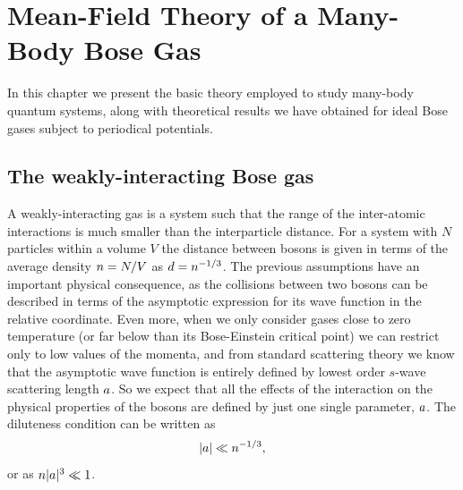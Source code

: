 \chapter{Mean-Field Theory of a Many-Body Bose Gas}%
\label{chap:mean-field-theory}


In this chapter we present the basic theory employed to study many-body quantum systems, along with theoretical
results we have obtained for ideal Bose gases subject to periodical potentials.


\section{The weakly-interacting Bose gas}
\label{sec:the-weakly-interacting-bose-gas}

A weakly-interacting gas is a system such that the range of the inter-atomic interactions is much smaller
than the
interparticle distance. For a system with $N$ particles within a volume $V$ the distance between bosons is given in
terms of the average density ${n} = N / V$ as $d = {n}^{-1/3}$. The previous assumptions have an
important physical consequence, as the collisions between two bosons can be described in terms of the asymptotic
expression for its wave function in the relative coordinate. Even more, when we only consider gases close to
zero temperature (or far below than its Bose-Einstein critical point) we can restrict only to low values of the
momenta, and from standard scattering theory we know that the asymptotic wave function is entirely defined by lowest
order $s$-wave scattering length $a$. So we expect that all the effects of the interaction on the physical properties
of the bosons are defined by just one single parameter, $a$. The diluteness condition can be written as
%
\begin{equation}
    \label{eq:diluteness-condition}
    |a| \ll n^{-1/3},
\end{equation}
%
or as $n |a|^3 \ll 1$.

